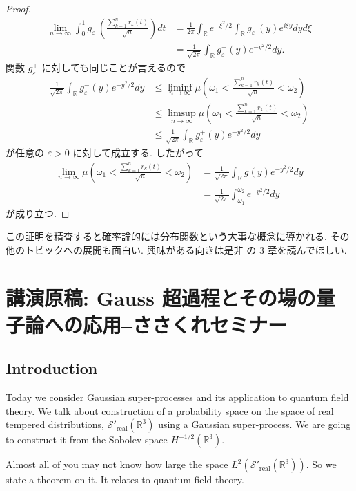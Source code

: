 \documentclass[openany, a4paper, oneside]{jsbook}
\theoremstyle{break}
\theoremstyle{breakdefn}
\newcommand{\rbk}[1]{\left (#1\right)}
\newcommand{\bbR}{\mathbb{R}}
\newcommand{\gvarepsilonminus}{g_{\varepsilon}^{-}}
\newcommand{\gvarepsilonplus}{g_{\varepsilon}^{+}}
\newcommand{\liminfntoinfty}{\liminf_{n \to \infty}}
\newcommand{\limntoinfty}{\lim_{n \to \infty}}
\newcommand{\limsupntoinfty}{\limsup_{n \to \infty}}
\newcommand{\realtempereddist}{\mathcal{S}'_{\mathrm{real}}}
\begin{document}
\begin{proof}
\begin{align}
 \limntoinfty \int_0^1 \gvarepsilonminus \rbk{\frac{\sum_{k=1}^{n} r_k (t)}{\sqrt{n}}} dt
 &=
 \frac{1}{2 \pi} \int_{\bbR} e^{- \xi^2 / 2} \int_{\bbR} \gvarepsilonminus (y) e^{i \xi y} dy d\xi \\
 &=
 \frac{1}{\sqrt{2 \pi}} \int_{\bbR} \gvarepsilonminus (y) e^{- y^2 / 2} dy.
\end{align}
関数 $\gvarepsilonplus$ に対しても同じことが言えるので
\begin{align}
 \frac{1}{\sqrt{2 \pi}} \int_{\bbR} \gvarepsilonminus (y) e^{- y^2 / 2} dy
 &\leq
 \liminfntoinfty \mu \rbk{\omega_1 < \frac{\sum_{k=1}^{n} r_k (t)}{\sqrt{n}} < \omega_2} \\
 &\leq
 \limsupntoinfty \mu \rbk{\omega_1 < \frac{\sum_{k=1}^{n} r_k (t)}{\sqrt{n}} < \omega_2} \\
 &\leq
 \frac{1}{\sqrt{2 \pi}} \int_{\bbR} \gvarepsilonplus (y) e^{- y^2 / 2} dy
\end{align}
が任意の $\varepsilon > 0$ に対して成立する.
したがって
\begin{align}
 \limntoinfty \mu \rbk{\omega_1 < \frac{\sum_{k=1}^{n} r_k (t)}{\sqrt{n}} < \omega_2}
 &=
 \frac{1}{\sqrt{2 \pi}} \int_{\bbR} g (y) e^{- y^2 / 2} dy \\
 &=
 \frac{1}{\sqrt{2 \pi}} \int_{\omega_1}^{\omega_2} e^{- y^2 / 2} dy
\end{align}
が成り立つ.
\end{proof}

この証明を精査すると確率論的には分布関数という大事な概念に導かれる.
その他のトピックへの展開も面白い.
興味がある向きは是非 \cite{MarkKac1} の 3 章を読んでほしい.
\chapter{講演原稿: Gauss 超過程とその場の量子論への応用--ささくれセミナー}

\section{Introduction}


Today we consider Gaussian super-processes and its application to quantum field theory.
We talk about construction of a probability space on the space of real tempered distributions,
$\realtempereddist (\mathbb{R}^3)$ using a Gaussian super-process.
We are going to construct it from the Sobolev space $H^{-1/2} (\mathbb{R}^3)$.

Almost all of you may not know how large the space $L^2 (\realtempereddist (\mathbb{R}^3))$.
So we state a theorem on it.
It relates to quantum field theory.
\end{document}
